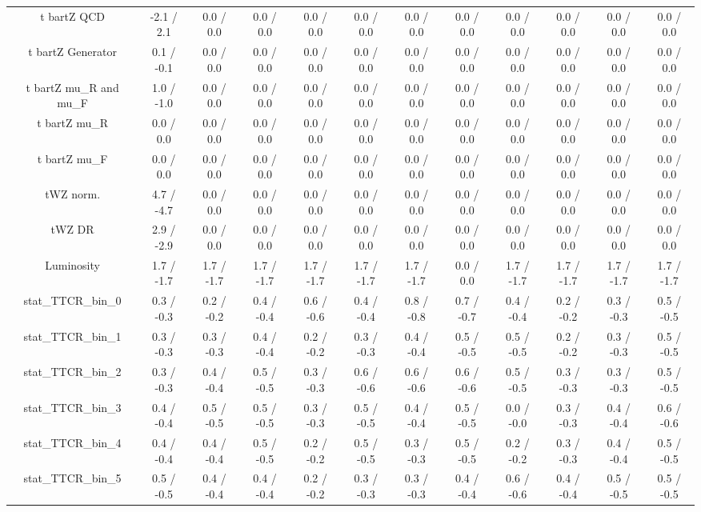 \begin{table}[htbp]
\begin{center}
\begin{tabular}{|c|c|c|c|c|c|c|c|c|c|c|c|}
  t bar{t}Z QCD & -2.1 / 2.1 & 0.0 / 0.0 & 0.0 / 0.0 & 0.0 / 0.0 & 0.0 / 0.0 & 0.0 / 0.0 & 0.0 / 0.0 & 0.0 / 0.0 & 0.0 / 0.0 & 0.0 / 0.0 & 0.0 / 0.0 \\ 
  t bar{t}Z Generator & 0.1 / -0.1 & 0.0 / 0.0 & 0.0 / 0.0 & 0.0 / 0.0 & 0.0 / 0.0 & 0.0 / 0.0 & 0.0 / 0.0 & 0.0 / 0.0 & 0.0 / 0.0 & 0.0 / 0.0 & 0.0 / 0.0 \\ 
  t bar{t}Z  mu_{R} and  mu_{F} & 1.0 / -1.0 & 0.0 / 0.0 & 0.0 / 0.0 & 0.0 / 0.0 & 0.0 / 0.0 & 0.0 / 0.0 & 0.0 / 0.0 & 0.0 / 0.0 & 0.0 / 0.0 & 0.0 / 0.0 & 0.0 / 0.0 \\ 
  t bar{t}Z  mu_{R} & 0.0 / 0.0 & 0.0 / 0.0 & 0.0 / 0.0 & 0.0 / 0.0 & 0.0 / 0.0 & 0.0 / 0.0 & 0.0 / 0.0 & 0.0 / 0.0 & 0.0 / 0.0 & 0.0 / 0.0 & 0.0 / 0.0 \\ 
  t bar{t}Z  mu_{F} & 0.0 / 0.0 & 0.0 / 0.0 & 0.0 / 0.0 & 0.0 / 0.0 & 0.0 / 0.0 & 0.0 / 0.0 & 0.0 / 0.0 & 0.0 / 0.0 & 0.0 / 0.0 & 0.0 / 0.0 & 0.0 / 0.0 \\ 
  tWZ norm. & 4.7 / -4.7 & 0.0 / 0.0 & 0.0 / 0.0 & 0.0 / 0.0 & 0.0 / 0.0 & 0.0 / 0.0 & 0.0 / 0.0 & 0.0 / 0.0 & 0.0 / 0.0 & 0.0 / 0.0 & 0.0 / 0.0 \\ 
  tWZ DR & 2.9 / -2.9 & 0.0 / 0.0 & 0.0 / 0.0 & 0.0 / 0.0 & 0.0 / 0.0 & 0.0 / 0.0 & 0.0 / 0.0 & 0.0 / 0.0 & 0.0 / 0.0 & 0.0 / 0.0 & 0.0 / 0.0 \\ 
  Luminosity & 1.7 / -1.7 & 1.7 / -1.7 & 1.7 / -1.7 & 1.7 / -1.7 & 1.7 / -1.7 & 1.7 / -1.7 & 0.0 / 0.0 & 1.7 / -1.7 & 1.7 / -1.7 & 1.7 / -1.7 & 1.7 / -1.7 \\ 
 stat_TTCR_bin_0 & 0.3 / -0.3 & 0.2 / -0.2 & 0.4 / -0.4 & 0.6 / -0.6 & 0.4 / -0.4 & 0.8 / -0.8 & 0.7 / -0.7 & 0.4 / -0.4 & 0.2 / -0.2 & 0.3 / -0.3 & 0.5 / -0.5 \\ 
 stat_TTCR_bin_1 & 0.3 / -0.3 & 0.3 / -0.3 & 0.4 / -0.4 & 0.2 / -0.2 & 0.3 / -0.3 & 0.4 / -0.4 & 0.5 / -0.5 & 0.5 / -0.5 & 0.2 / -0.2 & 0.3 / -0.3 & 0.5 / -0.5 \\ 
 stat_TTCR_bin_2 & 0.3 / -0.3 & 0.4 / -0.4 & 0.5 / -0.5 & 0.3 / -0.3 & 0.6 / -0.6 & 0.6 / -0.6 & 0.6 / -0.6 & 0.5 / -0.5 & 0.3 / -0.3 & 0.3 / -0.3 & 0.5 / -0.5 \\ 
 stat_TTCR_bin_3 & 0.4 / -0.4 & 0.5 / -0.5 & 0.5 / -0.5 & 0.3 / -0.3 & 0.5 / -0.5 & 0.4 / -0.4 & 0.5 / -0.5 & 0.0 / -0.0 & 0.3 / -0.3 & 0.4 / -0.4 & 0.6 / -0.6 \\ 
 stat_TTCR_bin_4 & 0.4 / -0.4 & 0.4 / -0.4 & 0.5 / -0.5 & 0.2 / -0.2 & 0.5 / -0.5 & 0.3 / -0.3 & 0.5 / -0.5 & 0.2 / -0.2 & 0.3 / -0.3 & 0.4 / -0.4 & 0.5 / -0.5 \\ 
 stat_TTCR_bin_5 & 0.5 / -0.5 & 0.4 / -0.4 & 0.4 / -0.4 & 0.2 / -0.2 & 0.3 / -0.3 & 0.3 / -0.3 & 0.4 / -0.4 & 0.6 / -0.6 & 0.4 / -0.4 & 0.5 / -0.5 & 0.5 / -0.5 \\ 

\end{tabular}
\end{center}
\end{table}
